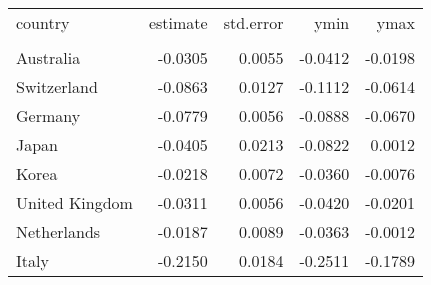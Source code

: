 \begin{tabular}{lrrrr}
   \toprule 
 
country & estimate & std.error & ymin & ymax \\ 

\cmidrule(lr){1-5} 
 
\\[-1.8ex]  
 
Australia & -0.0305 & 0.0055 & -0.0412 & -0.0198 \\ 
  Switzerland & -0.0863 & 0.0127 & -0.1112 & -0.0614 \\ 
  Germany & -0.0779 & 0.0056 & -0.0888 & -0.0670 \\ 
  Japan & -0.0405 & 0.0213 & -0.0822 & 0.0012 \\ 
  Korea & -0.0218 & 0.0072 & -0.0360 & -0.0076 \\ 
  United Kingdom & -0.0311 & 0.0056 & -0.0420 & -0.0201 \\ 
  Netherlands & -0.0187 & 0.0089 & -0.0363 & -0.0012 \\ 
  Italy & -0.2150 & 0.0184 & -0.2511 & -0.1789 \\ 
   \bottomrule  
\end{tabular}
